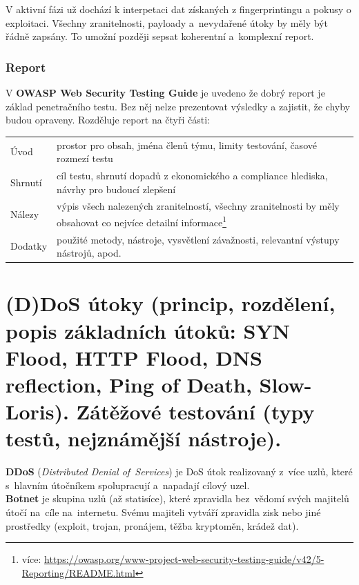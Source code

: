 V aktivní fázi už dochází k interpetaci dat získaných z fingerprintingu a pokusy o exploitaci. Všechny zranitelnosti, payloady a~nevydařené útoky by měly být řádně zapsány. To umožní později sepsat koherentní a~komplexní report. 

\subsubsection{Report}

V \textbf{OWASP Web Security Testing Guide} je uvedeno že dobrý report je základ penetračního testu. Bez něj nelze prezentovat výsledky a zajistit, že chyby budou opraveny. Rozděluje report na čtyři části:

\begin{table}[h]
\centering
\begin{tabular}{p{3cm}|p{12cm}}
Úvod      &  prostor pro obsah, jména členů týmu, limity testování, časové rozmezí testu\\
Shrnutí   &  cíl testu, shrnutí dopadů z ekonomického a compliance hlediska, návrhy pro budoucí zlepšení \\
Nálezy    &  výpis všech nalezených zranitelností, všechny zranitelnosti by měly obsahovat co nejvíce detailní informace\footnote{více: \url{https://owasp.org/www-project-web-security-testing-guide/v42/5-Reporting/README.html}} \\
Dodatky   & použité metody, nástroje, vysvětlení závažnosti, relevantní výstupy nástrojů, apod. \\
\end{tabular}
\end{table}


\clearpage
\section{(D)DoS útoky (princip, rozdělení, popis základních útoků: SYN Flood, HTTP Flood, DNS reflection, Ping of Death, Slow-Loris). Zátěžové testování (typy testů, nejznámější nástroje).}

\textbf{DDoS} (\emph{Distributed Denial of~Services}) je DoS útok realizovaný z~více uzlů, které s~hlavním útočníkem spolupracují a~napadají cílový uzel. \\
\textbf{Botnet} je skupina uzlů (až statisíce), které zpravidla bez~vědomí svých majitelů útočí na~cíle na~internetu. Svému majiteli vytváří zpravidla zisk nebo jiné prostředky (exploit, trojan, pronájem, těžba kryptoměn, krádež dat).

